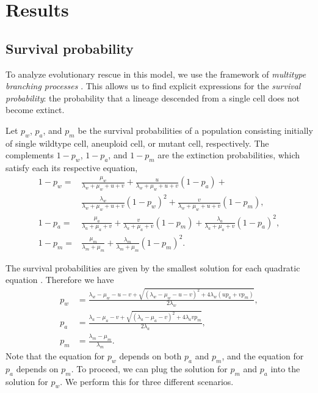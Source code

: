\documentclass[12pt]{extarticle}
\begin{document}

\section*{Results}


\subsection*{Survival probability}

To analyze evolutionary rescue in this model, we use the framework of \emph{multitype branching processes} \citep{rybnikov2021fitness,harris1963theory}. 
This allows us to find explicit expressions for the \emph{survival probability}: the probability that a lineage descended from a single cell does not become extinct.

Let $p_w$, $p_a$, and $p_m$ be the survival probabilities of a population consisting initially of single wildtype cell, aneuploid cell, or mutant cell, respectively.
The complements $1-p_w$, $1-p_a$, and $1-p_m$ are the extinction probabilities, which satisfy each its respective equation,
\begin{equation} \label{extinction_prob}
\begin{aligned}
1-p_w = &\frac{\mu_w}{\lambda_w+\mu_w+u+v} + 
		  \frac{u}{\lambda_w+\mu_w+u+v}\left(1-p_a\right) + \\
		  & \frac{\lambda_w}{\lambda_w+\mu_w+u+v}\left(1-p_w\right)^2 +
		  \frac{v}{\lambda_w+\mu_w+u+v}\left(1-p_m\right) ,\\
1-p_a = &\frac{\mu_a}{\lambda_a+\mu_a+v}+\frac{v}{\lambda_a+\mu_a+v}\left(1-p_m\right)+\frac{\lambda_a}{\lambda_a+\mu_a+v}\left(1-p_a\right)^2 ,\\
1-p_m = &\frac{\mu_m}{\lambda_m+\mu_m}+\frac{\lambda_m}{\lambda_m+\mu_m}\left(1-p_m\right)^2 .	 
\end{aligned}
\end{equation}

The survival probabilities are given by the smallest solution for each quadratic equation \citep{uecker2015adaptive}. Therefore we have
\begin{equation}\label{survival_prob}
\begin{aligned}
p_w &= \frac{\lambda_w-\mu_w-u-v+\sqrt{\left(\lambda_w-\mu_w-u-v\right)^2+4\lambda_w\left(up_a+vp_m\right)}}{2\lambda_w} ,\\
p_a &= \frac{\lambda_a-\mu_a-v+\sqrt{\left(\lambda_a-\mu_a-v\right)^2+4\lambda_avp_m}}{2\lambda_a}, \\
p_m &= \frac{\lambda_m-\mu_m}{\lambda_m} .
\end{aligned} 
\end{equation}
Note that the equation for $p_w$ depends on both $p_a$ and $p_m$, and the equation for $p_a$ depends on $p_m$.
To proceed, we can plug the solution for $p_m$ and $p_a$ into the solution for $p_w$. We perform this for three different scenarios.
\end{document}
